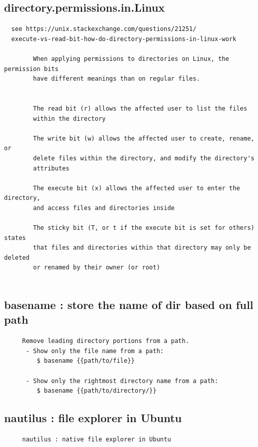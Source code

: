 \documentclass[a4paper,12pt]{article}
\begin{document}
\subsection{directory.permissions.in.Linux}
\begin{verbatim}
  see https://unix.stackexchange.com/questions/21251/
  execute-vs-read-bit-how-do-directory-permissions-in-linux-work

        When applying permissions to directories on Linux, the permission bits 
        have different meanings than on regular files.


        The read bit (r) allows the affected user to list the files 
        within the directory

        The write bit (w) allows the affected user to create, rename, or 
        delete files within the directory, and modify the directory's 
        attributes

        The execute bit (x) allows the affected user to enter the directory,  
        and access files and directories inside
        
        The sticky bit (T, or t if the execute bit is set for others) states 
        that files and directories within that directory may only be deleted 
        or renamed by their owner (or root)


\end{verbatim}




\subsection{basename  : store the name of dir based on full path}
\begin{verbatim}
     Remove leading directory portions from a path.
      - Show only the file name from a path:
         $ basename {{path/to/file}}

      - Show only the rightmost directory name from a path:
         $ basename {{path/to/directory/}}

\end{verbatim}


\subsection{nautilus  : file explorer in Ubuntu}
\begin{verbatim}
     nautilus : native file explorer in Ubuntu
\end{verbatim}
\end{document}
